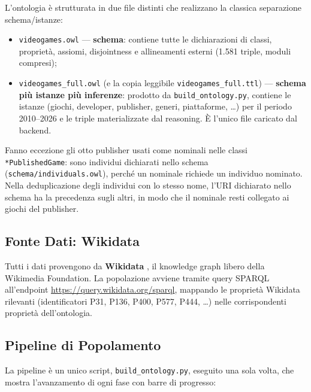 L'ontologia \`e strutturata in due file distinti che realizzano la classica
separazione schema/istanze:
\begin{itemize}[nosep]
  \item \texttt{videogames.owl} --- \textbf{schema}: contiene tutte le dichiarazioni
    di classi, propriet\`a, assiomi, disjointness e allineamenti esterni (1.581 triple, moduli compresi);
  \item \texttt{videogames\_full.owl} (e la copia leggibile \texttt{videogames\_full.ttl}) ---
    \textbf{schema pi\`u istanze pi\`u inferenze}: prodotto da \texttt{build\_ontology.py}, contiene le istanze
    (giochi, developer, publisher, generi, piattaforme, \dots{}) per il periodo 2010--2026 e le triple
    materializzate dal reasoning. \`E l'unico file caricato dal backend.
\end{itemize}
Fanno eccezione gli otto publisher usati come nominali nelle classi \texttt{*PublishedGame}: sono individui
dichiarati nello schema (\texttt{schema/individuals.owl}), perch\'e un nominale richiede un individuo
nominato. Nella deduplicazione degli individui con lo stesso nome, l'URI dichiarato nello schema ha la
precedenza sugli altri, in modo che il nominale resti collegato ai giochi del publisher.

\subsection{Fonte Dati: Wikidata}

Tutti i dati provengono da \textbf{Wikidata} \citep{wikidata}, il knowledge graph
libero della Wikimedia Foundation. La popolazione avviene tramite query SPARQL
all'endpoint \url{https://query.wikidata.org/sparql}, mappando le propriet\`a Wikidata
rilevanti (identificatori P31, P136, P400, P577, P444, \dots{}) nelle corrispondenti
propriet\`a dell'ontologia.

\subsection{Pipeline di Popolamento}

La pipeline \`e un unico script, \texttt{build\_ontology.py}, eseguito una sola volta, che
mostra l'avanzamento di ogni fase con barre di progresso:

